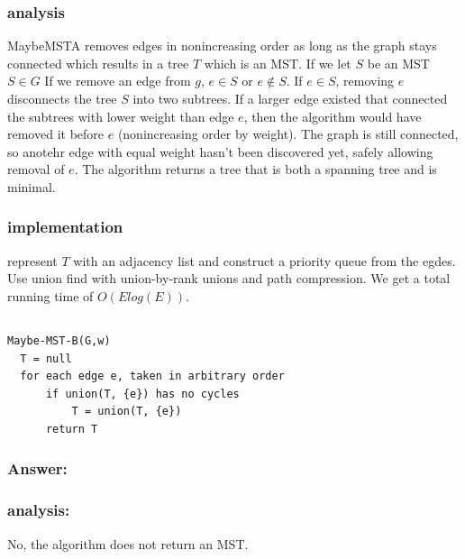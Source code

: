 \documentclass[titlepage]{article}
\theoremstyle{definition}
\begin{document}
    \subsubsection{analysis}
      MaybeMSTA removes edges in nonincreasing order as long as the graph stays
      connected which results in a tree $T$ which is an MST. If we let $S$ be an
      MST $S \in G$  If we remove an edge from $g$, $e \in S$ or $e \notin S$. If
      $e \in S$, removing $e$ disconnects the tree $S$ into two subtrees. If a
      larger edge existed that connected the subtrees with lower weight than edge
      $e$, then the algorithm would have removed it before $e$ (nonincreasing order
      by weight). The graph is still connected, so anotehr edge with equal weight
      hasn't been discovered yet, safely allowing removal of $e$. 
      The algorithm returns a tree that is both a spanning tree and is minimal.
    \subsubsection{implementation}
      represent $T$ with an adjacency list and construct a priority queue from
      the egdes. Use union find with union-by-rank unions and path compression.
      We get a total running time of $O\left(E log(E)\right)$.


\subsection{}
\begin{lstlisting}
Maybe-MST-B(G,w)
  T = null
  for each edge e, taken in arbitrary order
	  if union(T, {e}) has no cycles
		  T = union(T, {e})
	  return T
\end{lstlisting}
  \subsubsection{Answer: }
  \subsubsection{analysis: }
    No, the algorithm does not return an MST. 
      
\end{document}
